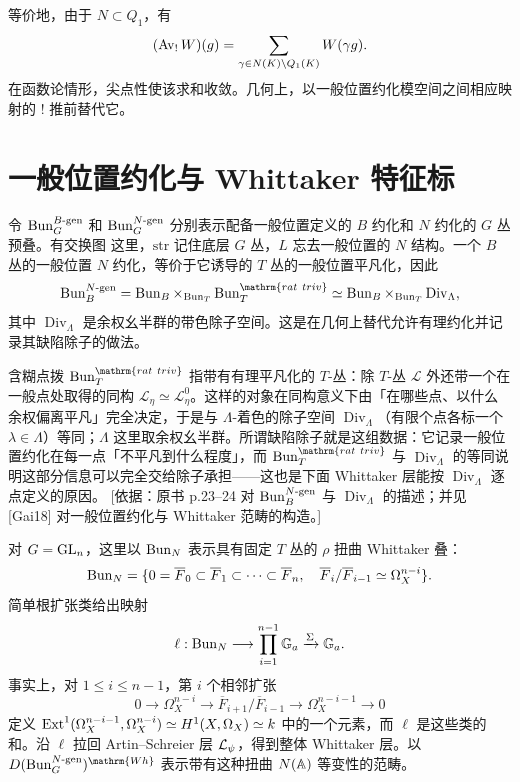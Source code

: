 等价地，由于 $N\subset Q_1$，有
\[(\operatorname{Av}_!W)(g)=\sum_{\gamma\in N(K)\backslash Q_1(K)}W(\gamma g).\]
在函数论情形，尖点性使该求和收敛。几何上，以一般位置约化模空间之间相应映射的 $!$ 推前替代它。
\section{一般位置约化与 Whittaker 特征标}\label{sec:3.7}
令 $\operatorname{Bun}_G^{B\text{-gen}}$ 和 $\operatorname{Bun}_G^{N\text{-gen}}$ 分别表示配备一般位置定义的 $B$ 约化和 $N$ 约化的 $G$ 丛预叠。有交换图
这里，$\mathrm{str}$ 记住底层 $G$ 丛，$L$ 忘去一般位置的 $N$ 结构。一个 $B$ 丛的一般位置 $N$ 约化，等价于它诱导的 $T$ 丛的一般位置平凡化，因此
\[\Bun_B^{N\text{-gen}}=\Bun_B\times_{\Bun_T}\Bun_T^{\mathrm{rat\ triv}}\simeq\Bun_B\times_{\Bun_T}\operatorname{Div}_\Lambda,\]
其中 $\operatorname{Div}_\Lambda$ 是余权幺半群的带色除子空间。这是在几何上替代允许有理约化并记录其缺陷除子的做法。

\begin{transnote}{含糊点拨}
$\Bun_T^{\mathrm{rat\ triv}}$ 指带有有理平凡化的 $T$-丛：除 $T$-丛 $\mathcal L$ 外还带一个在一般点处取得的同构 $\mathcal L_\eta\simeq\mathcal L^0_\eta$。这样的对象在同构意义下由「在哪些点、以什么余权偏离平凡」完全决定，于是与 $\Lambda$-着色的除子空间 $\operatorname{Div}_\Lambda$（有限个点各标一个 $\lambda\in\Lambda$）等同；$\Lambda$ 这里取余权幺半群。所谓缺陷除子就是这组数据：它记录一般位置约化在每一点「不平凡到什么程度」，而 $\Bun_T^{\mathrm{rat\ triv}}$ 与 $\operatorname{Div}_\Lambda$ 的等同说明这部分信息可以完全交给除子承担——这也是下面 Whittaker 层能按 $\operatorname{Div}_\Lambda$ 逐点定义的原因。
[依据：原书 p.23–24 对 $\operatorname{Bun}_B^{N\text{-gen}}$ 与 $\operatorname{Div}_\Lambda$ 的描述；并见 [Gai18] 对一般位置约化与 Whittaker 范畴的构造。]
\end{transnote}

对 $G=\operatorname{GL}_n$，这里以 $\operatorname{Bun}_N$ 表示具有固定 $T$ 丛的 $\rho$ 扭曲 Whittaker 叠：
\[\operatorname{Bun}_N=\{0=\overline F_0\subset\overline F_1\subset\cdots\subset\overline F_n,\quad\overline F_i/\overline F_{i-1}\simeq\Omega_X^{n-i}\}.\]
简单根扩张类给出映射
\[\ell:\operatorname{Bun}_N\longrightarrow\prod_{i=1}^{n-1}\mathbb{G}_{a}\xrightarrow{\Sigma}\mathbb{G}_{a}.\]
事实上，对 $1\le i\le n-1$，第 $i$ 个相邻扩张
\[0\longrightarrow\Omega_X^{n-i}\longrightarrow\overline F_{i+1}/\overline F_{i-1}\longrightarrow\Omega_X^{n-i-1}\longrightarrow0\]
定义 $\operatorname{Ext}^1(\Omega_X^{n-i-1},\Omega_X^{n-i})\simeq H^1(X,\Omega_X)\simeq k$ 中的一个元素，而 $\ell$ 是这些类的和。沿 $\ell$ 拉回 Artin–Schreier 层 $\mathcal{L}_\psi$，得到整体 Whittaker 层。以 $D(\Bun_G^{N\text{-gen}})^{\mathrm{Wh}}$ 表示带有这种扭曲 $N(\mathbb{A})$ 等变性的范畴。

